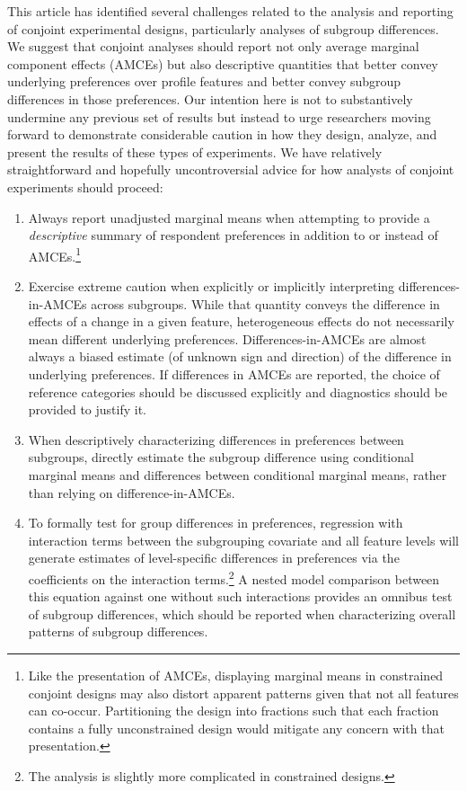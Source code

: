 \documentclass[a4paper,12pt]{article}\usepackage[]{graphicx}\usepackage[]{color}
\begin{document}
This article has identified several challenges related to the analysis and reporting of conjoint experimental designs, particularly analyses of subgroup differences. We suggest that conjoint analyses should report not only average marginal component effects (AMCEs) but also descriptive quantities that better convey underlying preferences over profile features and better convey subgroup differences in those preferences. Our intention here is not to substantively undermine any previous set of results but instead to urge researchers moving forward to demonstrate considerable caution in how they design, analyze, and present the results of these types of experiments. We have relatively straightforward and hopefully uncontroversial advice for how analysts of conjoint experiments should proceed:

\begin{enumerate}
\item Always report unadjusted marginal means when attempting to provide a \textit{descriptive} summary of respondent preferences in addition to or instead of AMCEs.\footnote{Like the presentation of AMCEs, displaying marginal means in constrained conjoint designs may also distort apparent patterns given that not all features can co-occur. Partitioning the design into fractions such that each fraction contains a fully unconstrained design would mitigate any concern with that presentation.}

\item Exercise extreme caution when explicitly or implicitly interpreting differences-in-AMCEs across subgroups. While that quantity conveys the difference in effects of a change in a given feature, heterogeneous effects do not necessarily mean different underlying preferences. Differences-in-AMCEs are almost always a biased estimate (of unknown sign and direction) of the difference in underlying preferences. If differences in AMCEs are reported, the choice of reference categories should be discussed explicitly and diagnostics should be provided to justify it.

\item When descriptively characterizing differences in preferences between subgroups, directly estimate the subgroup difference using conditional marginal means and differences between conditional marginal means, rather than relying on difference-in-AMCEs.

\item To formally test for group differences in preferences, regression with interaction terms between the subgrouping covariate and all feature levels will generate estimates of level-specific differences in preferences via the coefficients on the interaction terms.\footnote{The analysis is slightly more complicated in constrained designs.} A nested model comparison between this equation against one without such interactions provides an omnibus test of subgroup differences, which should be reported when characterizing overall patterns of subgroup differences.
\end{enumerate}
\end{document}
